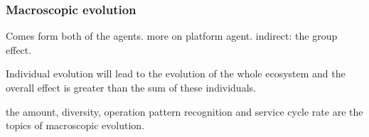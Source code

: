 



\subsubsection{Macroscopic evolution} %
\label{ssub:macroscopic_evolution}
Comes form both of the agents. more on platform agent.
indirect: the group effect.

Individual evolution will lead to the evolution of the whole ecosystem and the overall effect is greater than the sum of these individuals.

the amount, diversity, operation pattern recognition and service cycle rate are the topics of macroscopic evolution.

